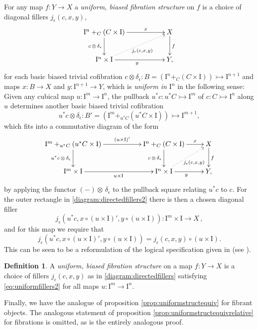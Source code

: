 \documentclass[11pt,reqno]{amsart}
\newcommand{\mono}{\ensuremath{\rightarrowtail}}
\newcommand{\ra}{\ensuremath{\rightarrow}}
\newcommand{\I}{\ensuremath{\mathrm{I}}}
\theoremstyle{remark}
\theoremstyle{definition}
\newtheorem{definition}[theorem]{Definition}
\begin{document}
For any map $f:Y\ra X$  a \emph{uniform, biased fibration structure} on $f$ is a choice of diagonal fillers $j_\epsilon(c,x,y)$,
\begin{equation}\label{diagram:directedfillers}
\xymatrix{
\I^n +_C (C\times\I) \ar[d]_{c\,\otimes\,\delta_\epsilon} \ar[rr]^-{x} && X \ar[d]^f \\
\I^{n}\times \I \ar@{.>}[rru]_{j_\epsilon(c,x,y)} \ar[rr]_y && Y,
}
\end{equation}
for each basic biased trivial cofibration $c \otimes \delta_\epsilon : B = (\I^n +_C (C\times\I)) \mono \I^{n+1}$ and maps $x : B\ra X$ and $y : \I^{n+1}\ra Y$, which is \emph{uniform in $\I^{n}$} in the following sense: Given any cubical map $u : \I^m \ra \I^n$, the pullback $u^*c : u^*C\mono \I^m$ of $c : C\mono \I^n$ along $u$ determines another basic biased trivial cofibration 
\[
u^*c \otimes \delta_\epsilon : B' = (\I^m +_{u^*C} (u^*C\times\I)) \mono \I^{m+1},
\]
which fits into a commutative diagram of the form
\begin{equation}\label{diagram:directedfillers2}
\xymatrix{
\I^m +_{u^*C} (u^*C\times\I) \ar[d]_{u^*c\,\otimes\,\delta_\epsilon} \ar[rr]^-{(u\times\I)'} && \I^n +_C (C\times\I) \ar[d]_{c\,\otimes\,\delta_\epsilon} \ar[r]^-{x} & X \ar[d]^f \\
\I^{m}\times \I  \ar[rr]_{u\times \I} && \I^{n}\times \I \ar@{.>}[ru]_{j_\epsilon(c,x,y)} \ar[r]_{y} & Y,
}
\end{equation}
by applying the functor $(-)\otimes\,\delta_\epsilon$ to the pullback square relating $u^*c$ to $c$.  For the outer rectangle in \eqref{diagram:directedfillers2} there is then a chosen diagonal filler 
\[
j_\epsilon(u^*c,x\circ(u\times\I)', y\circ(u\times\I)): \I^m\times\I\ra X\,,
\]
and for this map we require that
\begin{equation}\label{eq:uniformfillers2}
j_\epsilon(u^*c,x\circ (u\times\I)', y\circ(u\times\I)) = j_\epsilon(c,x,y)\circ(u\times \I).
\end{equation}
This can be seen to be a reformulation of the logical specification given in \cite{CCHM:2018ctt} (see \cite{AGH}).

\begin{definition}\label{def:uniform} A \emph{uniform, biased fibration structure} on a map $f: Y\ra X$ is a choice of fillers $j_\epsilon(c,x,y)$ as in \eqref{diagram:directedfillers} satisfying \eqref{eq:uniformfillers2} for all maps $u : \I^m\ra\I^n$.
\end{definition}

Finally, we have the analogue of proposition \ref{prop:uniformstructequiv} for fibrant objects. The analogous statement of proposition \ref{prop:uniformstructequivrelative} for fibrations is omitted, as is the entirely analogous proof.
\end{document}
